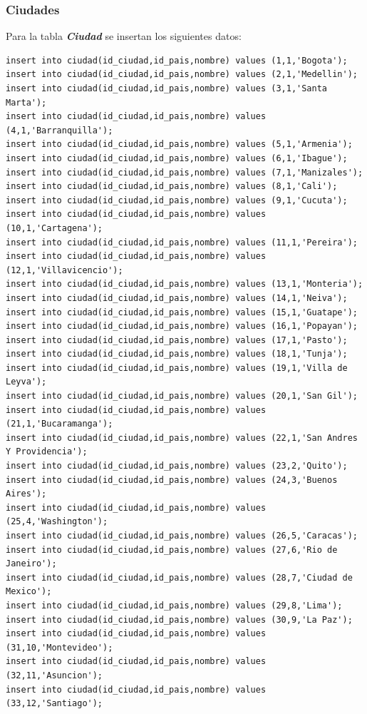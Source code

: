 \documentclass{article}
\begin{document}
\subsubsection{Ciudades}

Para la tabla \textit{\textbf{Ciudad}} se insertan los siguientes datos:

\begin{lstlisting}
insert into ciudad(id_ciudad,id_pais,nombre) values (1,1,'Bogota');
insert into ciudad(id_ciudad,id_pais,nombre) values (2,1,'Medellin');
insert into ciudad(id_ciudad,id_pais,nombre) values (3,1,'Santa Marta');
insert into ciudad(id_ciudad,id_pais,nombre) values (4,1,'Barranquilla');
insert into ciudad(id_ciudad,id_pais,nombre) values (5,1,'Armenia');
insert into ciudad(id_ciudad,id_pais,nombre) values (6,1,'Ibague');
insert into ciudad(id_ciudad,id_pais,nombre) values (7,1,'Manizales');
insert into ciudad(id_ciudad,id_pais,nombre) values (8,1,'Cali');
insert into ciudad(id_ciudad,id_pais,nombre) values (9,1,'Cucuta');
insert into ciudad(id_ciudad,id_pais,nombre) values (10,1,'Cartagena');
insert into ciudad(id_ciudad,id_pais,nombre) values (11,1,'Pereira');
insert into ciudad(id_ciudad,id_pais,nombre) values (12,1,'Villavicencio');
insert into ciudad(id_ciudad,id_pais,nombre) values (13,1,'Monteria');
insert into ciudad(id_ciudad,id_pais,nombre) values (14,1,'Neiva');
insert into ciudad(id_ciudad,id_pais,nombre) values (15,1,'Guatape');
insert into ciudad(id_ciudad,id_pais,nombre) values (16,1,'Popayan');
insert into ciudad(id_ciudad,id_pais,nombre) values (17,1,'Pasto');
insert into ciudad(id_ciudad,id_pais,nombre) values (18,1,'Tunja');
insert into ciudad(id_ciudad,id_pais,nombre) values (19,1,'Villa de Leyva');
insert into ciudad(id_ciudad,id_pais,nombre) values (20,1,'San Gil');
insert into ciudad(id_ciudad,id_pais,nombre) values (21,1,'Bucaramanga');
insert into ciudad(id_ciudad,id_pais,nombre) values (22,1,'San Andres Y Providencia');
insert into ciudad(id_ciudad,id_pais,nombre) values (23,2,'Quito');
insert into ciudad(id_ciudad,id_pais,nombre) values (24,3,'Buenos Aires');
insert into ciudad(id_ciudad,id_pais,nombre) values (25,4,'Washington');
insert into ciudad(id_ciudad,id_pais,nombre) values (26,5,'Caracas');
insert into ciudad(id_ciudad,id_pais,nombre) values (27,6,'Rio de Janeiro');
insert into ciudad(id_ciudad,id_pais,nombre) values (28,7,'Ciudad de Mexico');
insert into ciudad(id_ciudad,id_pais,nombre) values (29,8,'Lima');
insert into ciudad(id_ciudad,id_pais,nombre) values (30,9,'La Paz');
insert into ciudad(id_ciudad,id_pais,nombre) values (31,10,'Montevideo');
insert into ciudad(id_ciudad,id_pais,nombre) values (32,11,'Asuncion');
insert into ciudad(id_ciudad,id_pais,nombre) values (33,12,'Santiago');
\end{lstlisting}
\end{document}
